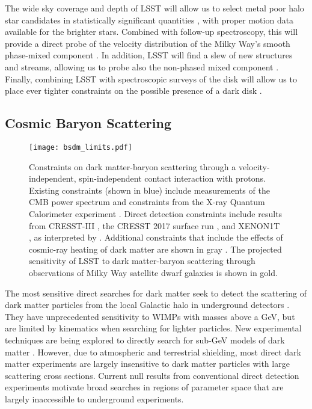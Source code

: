 The wide sky coverage and depth of LSST will allow us to select metal poor halo star candidates in statistically significant quantities \citep[\eg,][]{2017MNRAS.471.2587S}, with proper motion data available for the brighter stars. Combined with follow-up spectroscopy, this will provide a direct probe of the velocity distribution of the Milky Way's smooth phase-mixed component \citep{2018PhRvL.120d1102H}. In addition, LSST will find a slew of new structures and streams, allowing us to probe also the non-phased mixed component \citep{2005PhRvD..71d3516F,2018arXiv181011468E}. Finally, combining LSST with spectroscopic surveys of the disk will allow us to place ever tighter constraints on the possible presence of a dark disk \citep{2015MNRAS.450.2874R}.


\subsection{Cosmic Baryon Scattering }

\begin{figure}
\centering
\texttt{[image: bsdm\_limits.pdf]}
\caption{
Constraints on dark matter-baryon scattering through a velocity-independent, spin-independent contact interaction with protons. 
Existing constraints (shown in blue) include measurements of the CMB power spectrum \citep[CMB;][]{Gluscevic:2017ywp} and constraints from the X-ray Quantum Calorimeter experiment \citep[XQC;][]{0704.0794}. Direct detection constraints include results from CRESST-III \citep{1711.07692}, the CRESST 2017 surface run \citep{1707.06749}, and XENON1T \citep{1705.06655}, as interpreted by \citet[][]{1802.04764}. %
Additional constraints that include the effects of cosmic-ray heating of dark matter are shown in gray \citep[][]{1810.10543}.
The projected sensitivity of LSST to dark matter-baryon scattering through observations of Milky Way satellite dwarf galaxies is shown in gold.
}
\label{fig:dd}
\end{figure}

The most sensitive direct searches for dark matter seek to detect the scattering of dark matter particles from the local Galactic halo in underground detectors \citep[\eg,][]{1509.08767}. 
They have unprecedented sensitivity to WIMPs with masses above a GeV, but are limited by kinematics when searching for lighter particles. 
New experimental techniques are being explored to directly search for sub-GeV models of dark matter \citep{Battaglieri:2017aum}. 
However, due to atmospheric and terrestrial shielding, most direct dark matter experiments are largely insensitive to dark matter particles with large scattering cross sections. 
Current null results from conventional direct detection experiments motivate broad searches in regions of parameter space that are largely inaccessible to underground experiments. 


